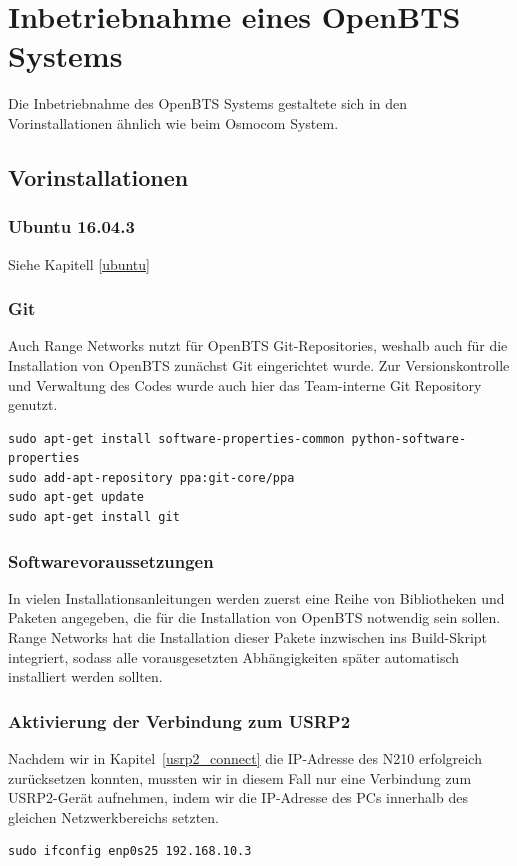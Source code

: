 
\section{Inbetriebnahme eines OpenBTS Systems}
Die Inbetriebnahme des OpenBTS Systems gestaltete sich in den Vorinstallationen ähnlich wie beim Osmocom System. 

\subsection{Vorinstallationen}

\subsubsection{Ubuntu 16.04.3}
Siehe Kapitell \ref{ubuntu}

\subsubsection{Git}
Auch Range Networks nutzt für OpenBTS Git-Repositories, weshalb auch für die Installation von OpenBTS zunächst Git eingerichtet wurde. Zur Versionskontrolle und Verwaltung des Codes wurde auch hier das Team-interne Git Repository genutzt.
\begin{lstlisting}
sudo apt-get install software-properties-common python-software-properties
sudo add-apt-repository ppa:git-core/ppa
sudo apt-get update
sudo apt-get install git
\end{lstlisting}

\subsubsection{Softwarevoraussetzungen}
In vielen Installationsanleitungen werden zuerst eine Reihe von Bibliotheken und Paketen angegeben, die für die Installation von OpenBTS notwendig sein sollen. Range Networks hat die Installation dieser Pakete inzwischen ins Build-Skript integriert, sodass alle vorausgesetzten Abhängigkeiten später automatisch installiert werden sollten.

\subsubsection{Aktivierung der Verbindung zum USRP2}
Nachdem wir in Kapitel~\ref{usrp2_connect} die IP-Adresse des N210 erfolgreich zurücksetzen konnten, mussten wir in diesem Fall nur eine Verbindung zum USRP2-Gerät aufnehmen, indem wir die IP-Adresse des PCs innerhalb des gleichen Netzwerkbereichs setzten.
\begin{lstlisting}
sudo ifconfig enp0s25 192.168.10.3
\end{lstlisting}

